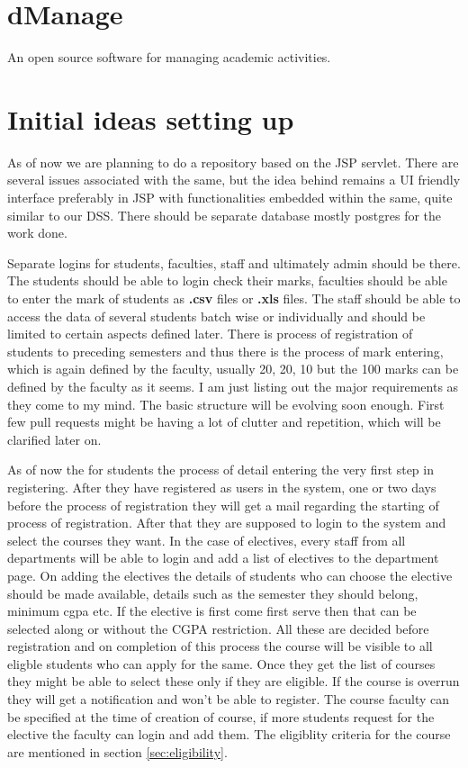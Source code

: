 \documentclass[a4paper,twoside]{article}
\begin{document}
\section{dManage}
An open source software for managing academic activities.
\section{Initial ideas setting up}
As of now we are planning to do a repository based on the JSP servlet. There are several issues associated with the same, but the idea behind remains a UI friendly interface preferably in JSP with functionalities embedded within the same, quite similar to  our DSS. There should be separate database mostly postgres for the work done.

Separate logins for students, faculties, staff and ultimately admin should be there. The students should be able to login check their marks, faculties should be able to enter the mark of students as \textbf{.csv }files or \textbf{.xls} files. The staff should be able to access the data of several students batch wise or individually and should be limited to certain aspects defined later. There is process of registration of students to preceding semesters and thus there is the process of mark entering, which is again defined by the faculty, usually 20, 20, 10 but the 100 marks can be defined by the faculty as it seems. I am just listing out the major requirements as they come to my mind. The basic structure will be evolving soon enough. First few pull requests might be having a lot of clutter and repetition, which will be clarified later on. 

As of now the for students the process of detail entering the very first step in registering. After they have registered as users in the system, one or two days before the process of registration they will get a mail regarding the starting of process of registration. After that they are supposed to login to the system and select the courses they want. In the case of electives, every staff from all departments will be able to login and add a list of electives to the department page. On adding the electives the details of students who can choose the elective should be made available, details such as the semester they should belong, minimum cgpa etc. If the elective is first come first serve then that can be selected along or without the CGPA restriction. All these are decided before registration and on completion of this process the course will be visible to all eligble students who can apply for the same. Once they get the list of courses they might be able to select these only if they are eligible. If the course is overrun they will get a notification and won't be able to register. The course faculty can be specified at the time of creation of course, if more students request for the elective the faculty can login and add them. The eligiblity criteria for the course are mentioned in section \ref{sec:eligibility}.
\end{document}
